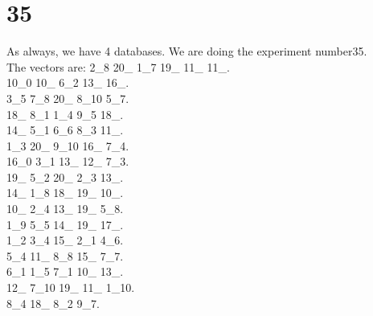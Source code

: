 \chapter{35}
\indent As always, we have 4 databases. We are doing the experiment number35.\\
The vectors are:
2\_8 20\_ 1\_7 19\_ 11\_ 11\_.\\10\_0 10\_ 6\_2 13\_ 16\_.\\3\_5 7\_8 20\_ 8\_10 5\_7.\\18\_ 8\_1 1\_4 9\_5 18\_.\\14\_ 5\_1 6\_6 8\_3 11\_.\\1\_3 20\_ 9\_10 16\_ 7\_4.\\16\_0 3\_1 13\_ 12\_ 7\_3.\\19\_ 5\_2 20\_ 2\_3 13\_.\\14\_ 1\_8 18\_ 19\_ 10\_.\\10\_ 2\_4 13\_ 19\_ 5\_8.\\1\_9 5\_5 14\_ 19\_ 17\_.\\1\_2 3\_4 15\_ 2\_1 4\_6.\\5\_4 11\_ 8\_8 15\_ 7\_7.\\6\_1 1\_5 7\_1 10\_ 13\_.\\12\_ 7\_10 19\_ 11\_ 1\_10.\\8\_4 18\_ 8\_2 9\_7.\\